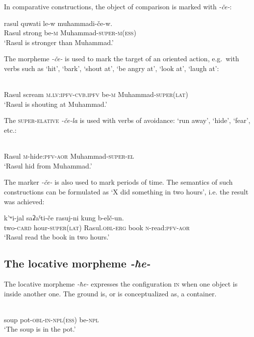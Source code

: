 ﻿\documentclass[output=paper]{langsci/langscibook}
\begin{document}
In comparative constructions, the object of comparison is marked with
\emph{-če-}:

\ea
\gll rasul quwati le-w muħammadi-če-w.\\
Rasul strong be-\textsc{m} Muhammad-\textsc{super}-\textsc{m}(\textsc{ess})\\
\glt `Rasul is stronger than Muhammad.'
\z

The morpheme \emph{-če-} is used to mark the target of an oriented action,
e.g.\ with verbs such as `hit', `bark', `shout at', `be angry at',
`look at', `laugh at':

\ea
{}\\
Rasul scream \textsc{m}.\textsc{lv}:\textsc{ipfv}-\textsc{cvb.ipfv} be-\textsc{m} Muhammad-\textsc{super}(\textsc{lat})\\
\glt `Rasul is shouting at Muhammad.'
\z

The \textsc{super}-\textsc{elative} \emph{-če-la} is used with verbs of
avoidance: `run away', `hide', `fear', etc.:

\ea
{}\\
Rasul \textsc{m}-hide:\textsc{pfv}-\textsc{aor} Muhammad-\textsc{super}-\textsc{el}\\
\glt `Rasul hid from Muhammad.'
\z

The marker \emph{-če-} is also used to mark periods of time.  The semantics of such constructions can be formulated as `X did something in two hours', i.e. the result was achieved:

\ea
\gll k'ʷi-jal saʡaˤti-če rasuj-ni kung b-elč-un.\\
two-\textsc{card} hour-\textsc{super}(\textsc{lat}) Rasul.\textsc{obl}-\textsc{erg} book \textsc{n}-read:\textsc{pfv}-\textsc{aor}\\
\glt `Rasul read the book in two hours.'
\z

\subsection{The locative morpheme \emph{-ħe-}}
\label{the-locative-morpheme--ux127e-}

The locative morpheme \emph{-ħe-} expresses the configuration
\textsc{in} when one object is inside another one. The ground is, or is
conceptualized as, a container.

\ea \label{ex:3:38}
\\
soup pot-\textsc{obl}-\textsc{in}-\textsc{npl}(\textsc{ess}) be-\textsc{npl}\\
\glt `The soup is in the pot.'
\z
\end{document}
